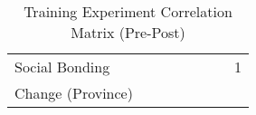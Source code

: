 \begin{table}[htbp]
{\begin{tabular}{lllccccc}
Social Bonding     &                                      &                                      &                      &                      &                      &                      & 1                    \\
Change (Province)  &                                      &                                      &                      &                      &                      &                      &               \\
\bottomrule      
\end{tabular}}
\caption{Training Experiment Correlation Matrix (Pre-Post)}
\label{tab:expcorr_prepost}
\end{table}